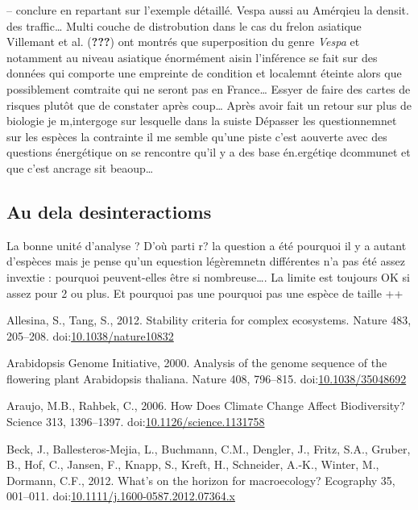 -- conclure en repartant sur l'exemple détaillé. Vespa aussi au Amérqieu
la densit. des traffic\ldots{} Multi couche de distrobution dans le cas
du frelon asiatique Villemant et al. ({\textbf{???}}) ont montrés que
superposition du genre \emph{Vespa} et notamment au niveau asiatique
énormément aisin l'inférence se fait sur des données qui comporte une
empreinte de condition et localemnt éteinte alors que possiblement
comtraite qui ne seront pas en France\ldots{} Essyer de faire des cartes
de risques plutôt que de constater après coup\ldots{} Après avoir fait
un retour sur plus de biologie je m,intergoge sur lesquelle dans la
suiste Dépasser les questionnemnet sur les espèces la contrainte il me
semble qu'une piste c'est aouverte avec des questions énergétique on se
rencontre qu'il y a des base én.ergétiqe dcommunet et que c'est ancrage
sit beaoup\ldots{}

\subsection{Au dela desinteractioms}\label{au-dela-desinteractioms}

La bonne unité d'analyse ? D'où parti r? la question a été pourquoi il y
a autant d'espèces mais je pense qu'un equestion légèremnetn différentes
n'a pas été assez invextie : pourquoi peuvent-elles être si
nombreuse\ldots{}. La limite est toujours OK si assez pour 2 ou plus. Et
pourquoi pas une pourquoi pas une espèce de taille ++

\hypertarget{refs}{}
\hypertarget{ref-Allesina2012a}{}
Allesina, S., Tang, S., 2012. Stability criteria for complex ecosystems.
Nature 483, 205--208.
doi:\href{https://doi.org/10.1038/nature10832}{10.1038/nature10832}

\hypertarget{ref-TheArabidopsisGenomeInitiative2000}{}
Arabidopsis Genome Initiative, 2000. Analysis of the genome sequence of
the flowering plant Arabidopsis thaliana. Nature 408, 796--815.
doi:\href{https://doi.org/10.1038/35048692}{10.1038/35048692}

\hypertarget{ref-Araujo2006}{}
Araujo, M.B., Rahbek, C., 2006. How Does Climate Change Affect
Biodiversity? Science 313, 1396--1397.
doi:\href{https://doi.org/10.1126/science.1131758}{10.1126/science.1131758}

\hypertarget{ref-Beck2012}{}
Beck, J., Ballesteros-Mejia, L., Buchmann, C.M., Dengler, J., Fritz,
S.A., Gruber, B., Hof, C., Jansen, F., Knapp, S., Kreft, H., Schneider,
A.-K., Winter, M., Dormann, C.F., 2012. What's on the horizon for
macroecology? Ecography 35, 001--011.
doi:\href{https://doi.org/10.1111/j.1600-0587.2012.07364.x}{10.1111/j.1600-0587.2012.07364.x}


